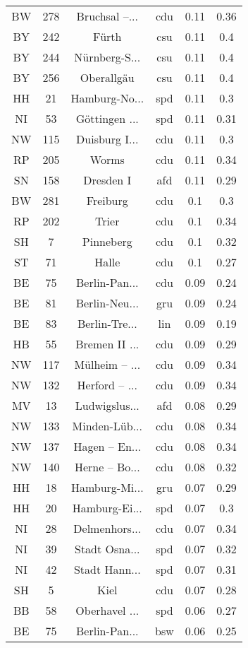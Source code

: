 \begin{table}[!htbp]
\begin{tabular}{@{\extracolsep{5pt}} cccccc}
BW & 278 & Bruchsal –... & cdu & 0.11 & 0.36 \\ 
BY & 242 & Fürth & csu & 0.11 & 0.4 \\ 
BY & 244 & Nürnberg-S... & csu & 0.11 & 0.4 \\ 
BY & 256 & Oberallgäu & csu & 0.11 & 0.4 \\ 
HH & 21 & Hamburg-No... & spd & 0.11 & 0.3 \\ 
NI & 53 & Göttingen ... & spd & 0.11 & 0.31 \\ 
NW & 115 & Duisburg I... & cdu & 0.11 & 0.3 \\ 
RP & 205 & Worms & cdu & 0.11 & 0.34 \\ 
SN & 158 & Dresden I & afd & 0.11 & 0.29 \\ 
BW & 281 & Freiburg & cdu & 0.1 & 0.3 \\ 
RP & 202 & Trier & cdu & 0.1 & 0.34 \\ 
SH & 7 & Pinneberg & cdu & 0.1 & 0.32 \\ 
ST & 71 & Halle & cdu & 0.1 & 0.27 \\ 
BE & 75 & Berlin-Pan... & cdu & 0.09 & 0.24 \\ 
BE & 81 & Berlin-Neu... & gru & 0.09 & 0.24 \\ 
BE & 83 & Berlin-Tre... & lin & 0.09 & 0.19 \\ 
HB & 55 & Bremen II ... & cdu & 0.09 & 0.29 \\ 
NW & 117 & Mülheim – ... & cdu & 0.09 & 0.34 \\ 
NW & 132 & Herford – ... & cdu & 0.09 & 0.34 \\ 
MV & 13 & Ludwigslus... & afd & 0.08 & 0.29 \\ 
NW & 133 & Minden-Lüb... & cdu & 0.08 & 0.34 \\ 
NW & 137 & Hagen – En... & cdu & 0.08 & 0.34 \\ 
NW & 140 & Herne – Bo... & cdu & 0.08 & 0.32 \\ 
HH & 18 & Hamburg-Mi... & gru & 0.07 & 0.29 \\ 
HH & 20 & Hamburg-Ei... & spd & 0.07 & 0.3 \\ 
NI & 28 & Delmenhors... & cdu & 0.07 & 0.34 \\ 
NI & 39 & Stadt Osna... & spd & 0.07 & 0.32 \\ 
NI & 42 & Stadt Hann... & spd & 0.07 & 0.31 \\ 
SH & 5 & Kiel & cdu & 0.07 & 0.28 \\ 
BB & 58 & Oberhavel ... & spd & 0.06 & 0.27 \\ 
BE & 75 & Berlin-Pan... & bsw & 0.06 & 0.25 \\ 

\end{tabular}
\end{table}
